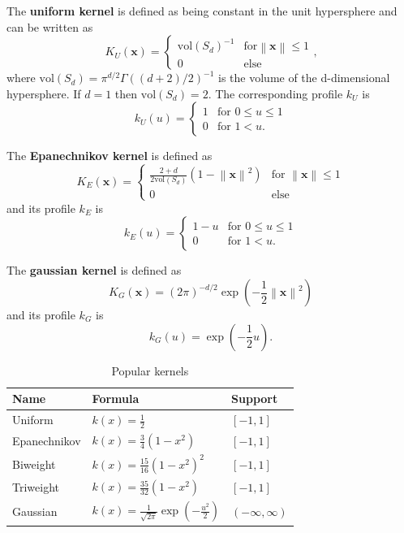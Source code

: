 \documentclass{article}
\newcommand{\norm}[1]{\left\lVert#1\right\rVert}
\begin{document}
The \textbf{uniform kernel} is defined as being constant in the unit hypersphere and can be written as
\begin{equation}
	K_U(\bm{x}) = \begin{cases}
		\text{vol}(S_d)^{-1} & \text{for} \norm{\bm{x}} \leq 1\\
		0 & \text{else}
	\end{cases}\text{,}
\end{equation}
where $\text{vol}(S_d) = \pi^{d/2}\Gamma((d+2)/2)^{-1}$ is the volume of the d-dimensional hypersphere. If $d=1$ then $\text{vol}(S_d)=2$. The corresponding profile $k_U$ is
\begin{equation}
	k_U(u) = \begin{cases}
		1 & \text{for } 0 \leq u \leq 1\\
		0 & \text{for } 1 < u\text{.}
	\end{cases}
\end{equation}

The \textbf{Epanechnikov kernel} is defined as
\begin{equation}
	K_E(\bm{x}) = \begin{cases}
		\frac{2 + d}{2 \text{vol}(S_d)} (1 - \norm{\bm{x}}^2) & \text{for } \norm{\bm{x}} \leq 1\\
		0 & \text{else}
	\end{cases}
\end{equation}
and its profile $k_E$ is
\begin{equation}
	k_E(u) = \begin{cases}
		1 - u & \text{for } 0 \leq u \leq 1\\
		0 & \text{for } 1 < u\text{.}
	\end{cases}
\end{equation}

The \textbf{gaussian kernel} is defined as
\begin{equation}
	K_G(\bm{x}) = (2 \pi)^{-d/2} \exp\left(-\frac{1}{2} \norm{\bm{x}}^2\right)
\end{equation}
and its profile $k_G$ is
\begin{equation}
	k_G(u) = \exp\left(-\frac{1}{2}u\right)\text{.}
\end{equation}



\begin{table}[]
	\centering
	\begin{tabular}{lll}
		\hline
		Name & Formula & Support \\ \hline
		Uniform & $k(x) = \frac{1}{2}$ & $[-1, 1]$ \\
		Epanechnikov & $k(x) = \frac{3}{4} (1 - x^2)$ & $[-1, 1]$ \\
		Biweight & $k(x) = \frac{15}{16} (1 - x^2)^2$ & $[-1, 1]$ \\
		Triweight & $k(x) = \frac{35}{32} (1 - x^2)$ & $[-1, 1]$ \\
		Gaussian & $k(x) = \frac{1}{\sqrt{2\pi}}\exp(-\frac{u^2}{2}) $ & $(-\infty, \infty)$
	\end{tabular}
	\caption{Popular kernels}
	\label{tab:popular-kernels}
\end{table}
\end{document}
